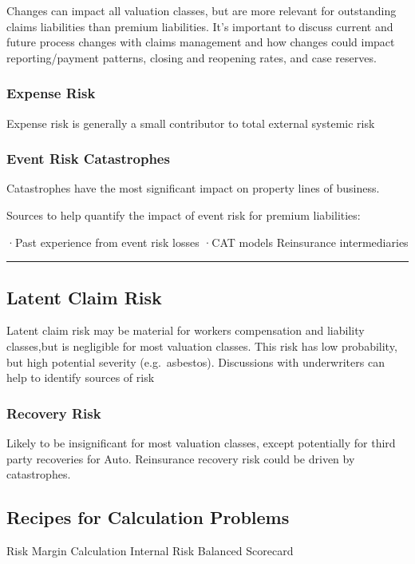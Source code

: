 \documentclass[
]{article}
\begin{document}
Changes can impact all valuation classes, but are more relevant for
outstanding claims liabilities than premium liabilities. It's important
to discuss current and future process changes with claims management and
how changes could impact reporting/payment patterns, closing and
reopening rates, and case reserves.

\subsubsection{Expense Risk}\label{expense-risk}

Expense risk is generally a small contributor to total external systemic
risk

\subsubsection{Event Risk Catastrophes}\label{event-risk-catastrophes}

Catastrophes have the most significant impact on property lines of
business.

Sources to help quantify the impact of event risk for premium
liabilities:

·Past experience from event risk losses ·CAT models Reinsurance
intermediaries

\begin{center}\rule{0.5\linewidth}{0.5pt}\end{center}

\subsection{Latent Claim Risk}\label{latent-claim-risk}

Latent claim risk may be material for workers compensation and liability
classes,but is negligible for most valuation classes. This risk has low
probability, but high potential severity (e.g.~asbestos). Discussions
with underwriters can help to identify sources of risk

\subsubsection{Recovery Risk}\label{recovery-risk}

Likely to be insignificant for most valuation classes, except
potentially for third party recoveries for Auto. Reinsurance recovery
risk could be driven by catastrophes.

\subsection{Recipes for Calculation
Problems}\label{recipes-for-calculation-problems-12}

Risk Margin Calculation Internal Risk Balanced Scorecard
\end{document}
